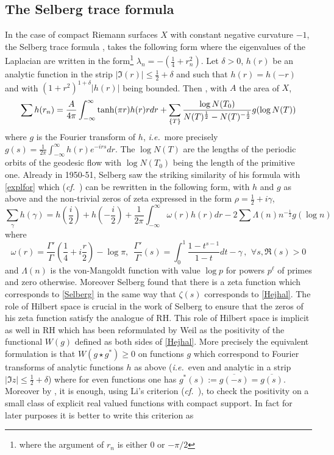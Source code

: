 \documentclass[12pt]{article}
\def\qqq{\,,\quad~\forall}
\def\qqq{\,,\,~\forall}
\newcommand{\ie}{{\it i.e.\/}\ }
\newcommand{\cf}{{\it cf.}}
\newcommand{\cff}{{\it cf.}~}
\begin{document}
\subsection{The Selberg trace formula}\label{sectSelberg}
In the case of compact Riemann surfaces $X$ with constant negative curvature $-1$, the Selberg trace formula \cite{Selberg}, takes the following form where the eigenvalues of the Laplacian are written in the form\footnote{where the argument of $r_n$ is either $0$ or $-\pi/2$} $\lambda_n=-(\frac 14+r_n^2)$. 
Let $\delta>0$, $h(r)$ be an analytic function in the strip $\vert \Im(r)\vert\leq \frac 12+\delta$ and such that $h(r)=h(-r)$ and with $(1+r^2)^{1+\delta}\vert h(r)\vert$ being bounded. Then \cite{Selberg, [Se],Hejhal}, with $A$ the area of $X$,
\begin{equation}\label{Selberg}
\sum h(r_n)=\frac{A}{4\pi}\int_{-\infty}^\infty {\rm tanh}(\pi r)h(r)rdr 
+\sum_{\{T\}}\frac{\log N(T_0)}{N(T)^\frac 12-N(T)^{-\frac 12}}g(\log N(T))
\end{equation}
where $g$ is the Fourier transform of $h$, \ie more precisely 
$g(s)=\frac{1}{2\pi}\int_{-\infty}^\infty h(r)e^{-irs}dr$. The $\log N(T)$ are the lengths of the periodic orbits of the geodesic flow with $\log N(T_0)$ being the length of the primitive one. 
Already in 1950-51, Selberg saw the striking similarity of his  formula with \eqref{explfor} which (\cf~\cite{Hejhal}) can be rewritten in the following form, with $h$ and $g$ as above and the non-trivial zeros of zeta expressed in the form 
 $\rho=\frac 12+i\gamma$,  
\begin{equation}\label{Hejhal}
\sum_\gamma h(\gamma)=h(\frac i2)+h(-\frac i2)+\frac{1}{2\pi}\int_{-\infty}^\infty \omega(r)h(r)dr-2\sum \Lambda(n)n^{-\frac 12}g(\log n)
\end{equation}
where
$$
\omega(r)=\frac{\Gamma'}{\Gamma}\left(\frac 14+i\frac r2\right)-\log \pi, \  \  \frac{\Gamma'}{\Gamma}\left(s\right)=\int_0^1\frac{1-t^{s-1}}{1-t}dt-\gamma\qqq s,\Re(s)>0
$$
and $\Lambda(n)$ is the von-Mangoldt function with value $\log p$ for powers $p^\ell$ of  primes and zero otherwise. 
Moreover Selberg found that there is a zeta function which corresponds to \eqref{Selberg} in the same way that $\zeta(s)$ corresponds to \eqref{Hejhal}.
The role of Hilbert space is crucial in the work of Selberg to ensure that the zeros of his zeta  function satisfy the analogue of RH. This role of Hilbert space is implicit as well in RH which has been reformulated by Weil as the positivity of the functional $W(g)$ defined as both sides  of \eqref{Hejhal}. More precisely the equivalent formulation  is that  $W(g\star g^*)\geq 0$ on functions $g$ which correspond to Fourier transforms of analytic functions $h$ as above (\ie even and analytic in a strip $\vert\Im z\vert \leq \frac 12+\delta$) where for even functions one has $g^*(s):=\overline{ g(-s)}=\overline{ g(s)}$. Moreover by \cite{B3,burnol1},  it is enough, using Li's criterion (\cff\cite{Li,B3}), to check the positivity on a small class of explicit real valued functions with compact support. In fact for later purposes it is better to write this criterion as
\end{document}
